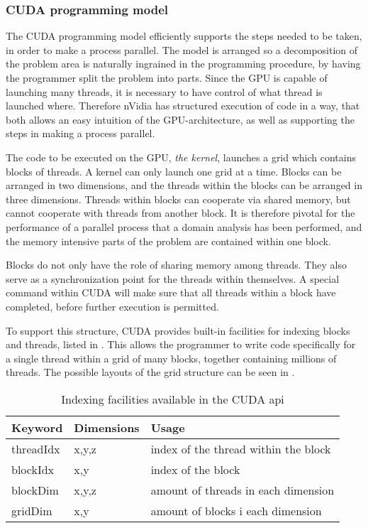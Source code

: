 \subsubsection{CUDA programming model}
The CUDA programming model efficiently supports the steps needed to be taken, in order to make a process parallel. The model is arranged so a decomposition of the problem area is naturally ingrained in the programming procedure, by having the programmer split the problem into parts. Since the GPU is capable of launching many threads, it is necessary to have control of what thread is launched where. Therefore nVidia has structured execution of code in a way, that both allows an easy intuition of the GPU-architecture, as well as supporting the steps in making a process parallel.

The code to be executed on the GPU, \emph{the kernel}, launches a grid which contains blocks of threads. A kernel can only launch one grid at a time. Blocks can be arranged in two dimensions, and the threads within the blocks can be arranged in three dimensions. Threads within blocks can cooperate via shared memory, but cannot cooperate with threads from another block. It is therefore pivotal for the performance of a parallel process that a domain analysis has been performed, and the memory intensive parts of the problem are contained within one block.

Blocks do not only have the role of sharing memory among threads. They also serve as a synchronization point for the threads within themselves. A special command within CUDA will make sure that all threads within a block have completed, before further execution is permitted.

To support this structure, CUDA provides built-in facilities for indexing blocks and threads, listed in . This allows the programmer to write code specifically for a single thread within a grid of many blocks, together containing millions of threads. The possible layouts of the grid structure can be seen in .

\begin{table}[htb]
	\centering
	\begin{tabular}{lll}
		\toprule
		Keyword & Dimensions & Usage \\
		\midrule
		threadIdx & x,y,z & index of the thread within the block \\
		blockIdx & x,y & index of the block  \\
		blockDim & x,y,z & amount of threads in each dimension \\
		gridDim & x,y & amount of blocks i each dimension \\
		\bottomrule
	\end{tabular}
	\caption{Indexing facilities available in the CUDA api}
	\label{cudaindex}
\end{table}


